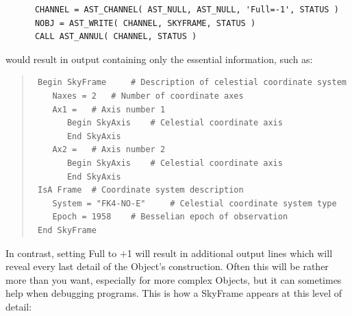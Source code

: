 \documentclass[twoside,11pt]{article}
\newcommand{\htmlref}[2]{#1}
\begin{document}
\small
\begin{verbatim}
      CHANNEL = AST_CHANNEL( AST_NULL, AST_NULL, 'Full=-1', STATUS )
      NOBJ = AST_WRITE( CHANNEL, SKYFRAME, STATUS )
      CALL AST_ANNUL( CHANNEL, STATUS )
\end{verbatim}
\normalsize

would result in output containing only the essential information, such
as:

\begin{quote}
\small
\begin{verbatim}
 Begin SkyFrame 	# Description of celestial coordinate system
    Naxes = 2 	# Number of coordinate axes
    Ax1 = 	# Axis number 1
       Begin SkyAxis 	# Celestial coordinate axis
       End SkyAxis
    Ax2 = 	# Axis number 2
       Begin SkyAxis 	# Celestial coordinate axis
       End SkyAxis
 IsA Frame 	# Coordinate system description
    System = "FK4-NO-E" 	# Celestial coordinate system type
    Epoch = 1958 	# Besselian epoch of observation
 End SkyFrame
\end{verbatim}
\normalsize
\end{quote}

In contrast, setting Full to $+$1 will result in additional output
lines which will reveal every last detail of the \htmlref{Object}{Object}'s
construction. Often this will be rather more than you want, especially
for more complex Objects, but it can sometimes help when debugging
programs. This is how a \htmlref{SkyFrame}{SkyFrame} appears at this level of detail:
\end{document}
